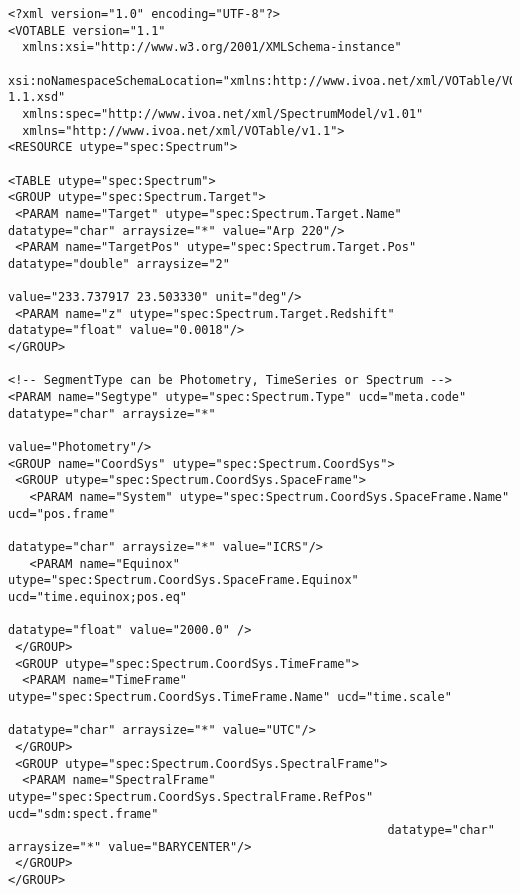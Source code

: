 
{ \footnotesize

\begin{flushleft}
\begin{fmpage}

\begin{verbatim}
<?xml version="1.0" encoding="UTF-8"?>
<VOTABLE version="1.1"
  xmlns:xsi="http://www.w3.org/2001/XMLSchema-instance"
  xsi:noNamespaceSchemaLocation="xmlns:http://www.ivoa.net/xml/VOTable/VOTable-1.1.xsd" 
  xmlns:spec="http://www.ivoa.net/xml/SpectrumModel/v1.01"
  xmlns="http://www.ivoa.net/xml/VOTable/v1.1">
<RESOURCE utype="spec:Spectrum">

<TABLE utype="spec:Spectrum">
<GROUP utype="spec:Spectrum.Target">
 <PARAM name="Target" utype="spec:Spectrum.Target.Name" datatype="char" arraysize="*" value="Arp 220"/>
 <PARAM name="TargetPos" utype="spec:Spectrum.Target.Pos" datatype="double" arraysize="2" 
                                                              value="233.737917 23.503330" unit="deg"/>
 <PARAM name="z" utype="spec:Spectrum.Target.Redshift" datatype="float" value="0.0018"/>
</GROUP>

<!-- SegmentType can be Photometry, TimeSeries or Spectrum -->
<PARAM name="Segtype" utype="spec:Spectrum.Type" ucd="meta.code" datatype="char" arraysize="*" 
                                                                                   value="Photometry"/>
<GROUP name="CoordSys" utype="spec:Spectrum.CoordSys">
 <GROUP utype="spec:Spectrum.CoordSys.SpaceFrame">
   <PARAM name="System" utype="spec:Spectrum.CoordSys.SpaceFrame.Name" ucd="pos.frame" 
                                                           datatype="char" arraysize="*" value="ICRS"/>
   <PARAM name="Equinox" utype="spec:Spectrum.CoordSys.SpaceFrame.Equinox" ucd="time.equinox;pos.eq" 
                                                                     datatype="float" value="2000.0" />
 </GROUP>
 <GROUP utype="spec:Spectrum.CoordSys.TimeFrame">
  <PARAM name="TimeFrame" utype="spec:Spectrum.CoordSys.TimeFrame.Name" ucd="time.scale" 
                                                            datatype="char" arraysize="*" value="UTC"/>
 </GROUP>
 <GROUP utype="spec:Spectrum.CoordSys.SpectralFrame">
  <PARAM name="SpectralFrame" utype="spec:Spectrum.CoordSys.SpectralFrame.RefPos" ucd="sdm:spect.frame" 
                                                     datatype="char" arraysize="*" value="BARYCENTER"/>
 </GROUP>
</GROUP>

\end{verbatim}
\end{fmpage}


\end{flushleft}}
